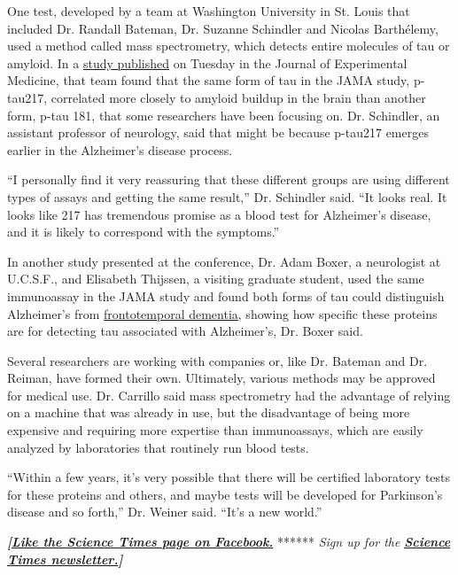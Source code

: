 One test, developed by a team at Washington University in St. Louis that
included Dr. Randall Bateman, Dr. Suzanne Schindler and Nicolas
Barthélemy, used a method called mass spectrometry, which detects entire
molecules of tau or amyloid. In a
\href{https://rupress.org/jem/article-lookup/doi/10.1084/jem.20200861}{study
published} on Tuesday in the Journal of Experimental Medicine, that team
found that the same form of tau in the JAMA study, p-tau217, correlated
more closely to amyloid buildup in the brain than another form, p-tau
181, that some researchers have been focusing on. Dr. Schindler, an
assistant professor of neurology, said that might be because p-tau217
emerges earlier in the Alzheimer's disease process.

``I personally find it very reassuring that these different groups are
using different types of assays and getting the same result,'' Dr.
Schindler said. ``It looks real. It looks like 217 has tremendous
promise as a blood test for Alzheimer's disease, and it is likely to
correspond with the symptoms.''

In another study presented at the conference, Dr. Adam Boxer, a
neurologist at U.C.S.F., and Elisabeth Thijssen, a visiting graduate
student, used the same immunoassay in the JAMA study and found both
forms of tau could distinguish Alzheimer's from
\href{https://www.nytimes.com/2012/05/06/health/a-rare-form-of-dementia-tests-a-vow-of-for-better-for-worse.html}{frontotemporal
dementia}, showing how specific these proteins are for detecting tau
associated with Alzheimer's, Dr. Boxer said.

Several researchers are working with companies or, like Dr. Bateman and
Dr. Reiman, have formed their own. Ultimately, various methods may be
approved for medical use. Dr. Carrillo said mass spectrometry had the
advantage of relying on a machine that was already in use, but the
disadvantage of being more expensive and requiring more expertise than
immunoassays, which are easily analyzed by laboratories that routinely
run blood tests.

``Within a few years, it's very possible that there will be certified
laboratory tests for these proteins and others, and maybe tests will be
developed for Parkinson's disease and so forth,'' Dr. Weiner said.
``It's a new world.''

\textbf{\emph{{[}}\href{http://on.fb.me/1paTQ1h}{\emph{Like the Science
Times page on Facebook.}}} ****** \emph{\textbar{} Sign up for the}
\textbf{\href{http://nyti.ms/1MbHaRU}{\emph{Science Times
newsletter.}}\emph{{]}}}

